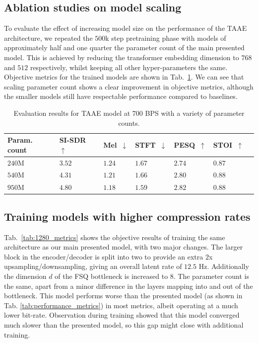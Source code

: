 \documentclass{article} %
\begin{document}
\subsection{Ablation studies on model scaling}
\label{app:scaling_ablation}
To evaluate the effect of increasing model size on the performance of the TAAE architecture, we repeated the $500$k step pretraining phase with models of approximately half and one quarter the parameter count of the main presented model. This is achieved by reducing the transformer embedding dimension to $768$ and $512$ respectively, whilst keeping all other hyper-parameters the same. Objective metrics for the trained models are shown in Tab.~\ref{tab:taae_scaling}. We can see that scaling parameter count shows a clear improvement in objective metrics, although the smaller models still have respectable performance compared to baselines.
\begin{table}[h]
\centering
\scriptsize
\begin{tabularx}{0.8\textwidth}{
    >{\raggedright\arraybackslash}m{2cm} %
    >{\centering\arraybackslash}X %
    >{\centering\arraybackslash}X %
    >{\centering\arraybackslash}X %
    >{\centering\arraybackslash}X %
    >{\centering\arraybackslash}X %
    >{\centering\arraybackslash}X %
}
\toprule
\textbf{Param. count} & \textbf{SI-SDR~$\uparrow$} & \textbf{Mel~$\downarrow$} & \textbf{STFT~$\downarrow$} & \textbf{PESQ~$\uparrow$} & \textbf{STOI~$\uparrow$} \\
\midrule
$240$M           & $3.52$ & $1.24$ & $1.67$ & $2.74$ & $0.87$ \\
$540$M           & $4.31$	& $1.21$ & $1.66$ & $2.80$ & $0.88$ \\
$950$M           & $4.80$	& $1.18$ & $1.59$ & $2.82$ & $0.88$ \\
\bottomrule
\end{tabularx}
\caption{Evaluation results for TAAE model at 700 BPS with a variety of parameter counts.}
\vspace{-2mm}
\label{tab:taae_scaling}
\end{table}

\subsection{Training models with higher compression rates}
\label{app:high_compression}
Tab.~\ref{tab:1280_metrics} shows the objective results of training the same architecture as our main presented model, with two major changes. The larger block in the encoder/decoder is split into two to provide an extra $2$x upsampling/downsampling, giving an overall latent rate of $12.5$ Hz. Additionally the dimension $d$ of the FSQ bottleneck is increased to $8$. The parameter count is the same, apart from a minor difference in the layers mapping into and out of the bottleneck. This model performs worse than the presented model (as shown in Tab. \ref{tab:performance_metrics}) in most metrics, albeit operating at a much lower bit-rate. Observation during training showed that this model converged much slower than the presented model, so this gap might close with additional training.
\end{document}
